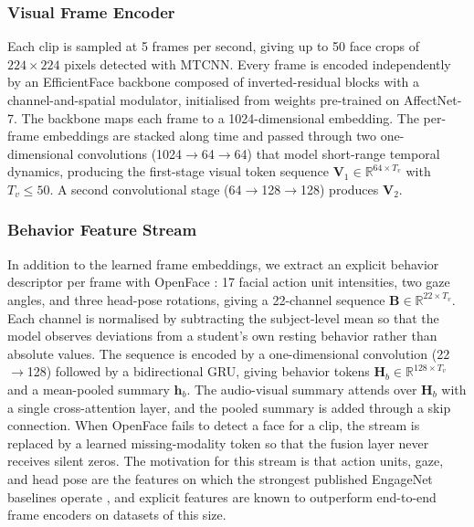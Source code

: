 \documentclass[journal]{IEEEtran}
\begin{document}
\subsubsection{Visual Frame Encoder}
Each clip is sampled at 5 frames per second, giving up to 50 face crops of $224 \times 224$ pixels detected with MTCNN. Every frame is encoded independently by an EfficientFace backbone \cite{zhao2021efficientface} composed of inverted-residual blocks with a channel-and-spatial modulator, initialised from weights pre-trained on AffectNet-7. The backbone maps each frame to a 1024-dimensional embedding. The per-frame embeddings are stacked along time and passed through two one-dimensional convolutions (1024$\to$64$\to$64) that model short-range temporal dynamics, producing the first-stage visual token sequence $\mathbf{V}_1 \in \mathbb{R}^{64 \times T_v}$ with $T_v \le 50$. A second convolutional stage (64$\to$128$\to$128) produces $\mathbf{V}_2$.

\subsubsection{Behavior Feature Stream}
In addition to the learned frame embeddings, we extract an explicit behavior descriptor per frame with OpenFace \cite{baltrusaitis2018openface}: 17 facial action unit intensities, two gaze angles, and three head-pose rotations, giving a 22-channel sequence $\mathbf{B} \in \mathbb{R}^{22 \times T_v}$. Each channel is normalised by subtracting the subject-level mean so that the model observes deviations from a student's own resting behavior rather than absolute values. The sequence is encoded by a one-dimensional convolution (22$\to$128) followed by a bidirectional GRU, giving behavior tokens $\mathbf{H}_b \in \mathbb{R}^{128 \times T_v}$ and a mean-pooled summary $\mathbf{h}_b$. The audio-visual summary attends over $\mathbf{H}_b$ with a single cross-attention layer, and the pooled summary is added through a skip connection. When OpenFace fails to detect a face for a clip, the stream is replaced by a learned missing-modality token so that the fusion layer never receives silent zeros. The motivation for this stream is that action units, gaze, and head pose are the features on which the strongest published EngageNet baselines operate \cite{singh2023engagenet}, and explicit features are known to outperform end-to-end frame encoders on datasets of this size.

\end{document}
